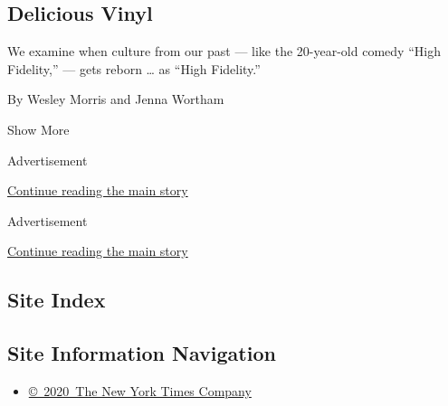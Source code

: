 \begin{enumerate}
  \hypertarget{delicious-vinyl}{%
  \subsection{Delicious Vinyl}\label{delicious-vinyl}}

  We examine when culture from our past --- like the 20-year-old comedy
  ``High Fidelity,'' --- gets reborn \ldots{} as ``High Fidelity.''

  By Wesley Morris and Jenna Wortham
\end{enumerate}

Show More

Advertisement

\protect\hyperlink{after-mid1}{Continue reading the main story}

Advertisement

\protect\hyperlink{after-mktg}{Continue reading the main story}

\hypertarget{site-index}{%
\subsection{Site Index}\label{site-index}}

\hypertarget{site-information-navigation}{%
\subsection{Site Information
Navigation}\label{site-information-navigation}}

\begin{itemize}
\tightlist
\item
  \href{https://help.nytimes3xbfgragh.onion/hc/en-us/articles/115014792127-Copyright-notice}{©~2020~The
  New York Times Company}
\end{itemize}

